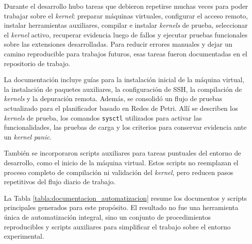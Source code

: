 Durante el desarrollo hubo tareas que debieron repetirse muchas veces para poder trabajar sobre el \textit{kernel}: preparar máquinas virtuales, configurar el acceso remoto, instalar herramientas auxiliares, compilar e instalar \textit{kernels} de prueba, seleccionar el \textit{kernel} activo, recuperar evidencia luego de fallos y ejecutar pruebas funcionales sobre las extensiones desarrolladas. Para reducir errores manuales y dejar un camino reproducible para trabajos futuros, esas tareas fueron documentadas en el repositorio de trabajo.\par

La documentación incluye guías para la instalación inicial de la máquina virtual, la instalación de paquetes auxiliares, la configuración de SSH, la compilación de \textit{kernels} y la depuración remota. Además, se consolidó un flujo de pruebas actualizado para el planificador basado en Redes de Petri. Allí se describen los \textit{kernels} de prueba, los comandos \texttt{sysctl} utilizados para activar las funcionalidades, las pruebas de carga y los criterios para conservar evidencia ante un \textit{kernel panic}.\par

También se incorporaron scripts auxiliares para tareas puntuales del entorno de desarrollo, como el inicio de la máquina virtual. Estos scripts no reemplazan el proceso completo de compilación ni validación del \textit{kernel}, pero reducen pasos repetitivos del flujo diario de trabajo.\par

La Tabla \ref{tabla:documentacion_automatizacion} resume los documentos y scripts principales generados para este propósito. El resultado no fue una herramienta única de automatización integral, sino un conjunto de procedimientos reproducibles y scripts auxiliares para simplificar el trabajo sobre el entorno experimental.\par

